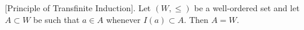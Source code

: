 [Principle of Transfinite Induction]. Let $(W, \leq)$ be a well-ordered set and let $A \subset W$ be such that $a \in A$ whenever $I(a) \subset A$. Then $A = W$.